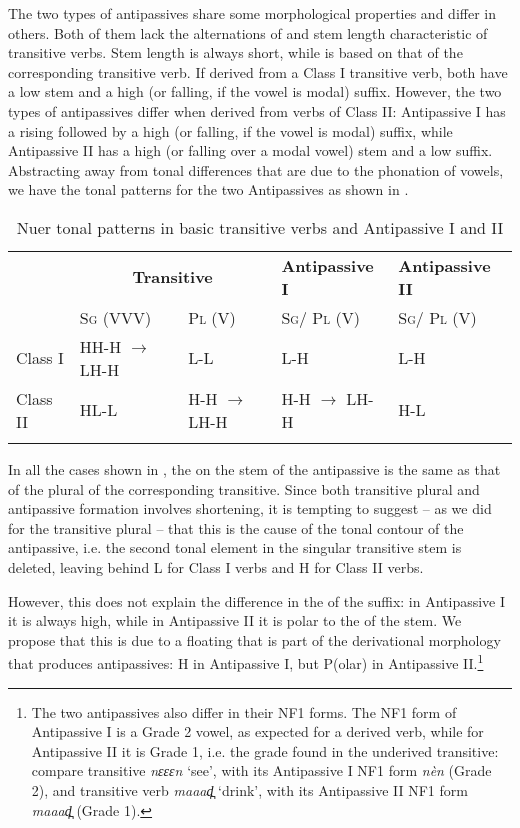 \documentclass[output=paper,newtxmath,modfonts,nonflat]{langsci/langscibook}
\begin{document}
The two types of antipassives share some morphological properties and differ in others. Both of them lack the alternations of  and stem length characteristic of transitive verbs. Stem length is always short, while  is based on that of the corresponding transitive verb. If derived from a Class I transitive verb, both have a low  stem and a high  (or falling, if the vowel is modal) suffix. However, the two types of antipassives differ when derived from verbs of Class II: Antipassive I has a rising  followed by a high (or falling, if the vowel is modal) suffix, while Antipassive II has a high (or falling over a modal vowel) stem and a low suffix. Abstracting away from tonal differences that are due to the phonation of vowels, we have the tonal patterns for the two Antipassives as shown in .

\newpage

\begin{table}
\begin{tabularx}{\textwidth}{llXXX} 
\lsptoprule
& \multicolumn{2}{c}{\bfseries Transitive} & \bfseries Antipassive I & \bfseries Antipassive II\\
& \textsc{Sg} (VVV) & \textsc{Pl} (V) & \textsc{Sg}/ \textsc{Pl} (V) & \textsc{Sg}/ \textsc{Pl} (V)\\
\midrule
Class I & HH-H $\rightarrow$ LH-H & L-L & L-H & L-H\\
Class II & HL-L & H-H $\rightarrow$ LH-H & H-H $\rightarrow$ LH-H & H-L\\
\lspbottomrule
\end{tabularx}
\caption{Nuer tonal patterns in basic transitive verbs and Antipassive I and II}
\label{tab:monich:13}
\end{table}

In all the cases shown in , the  on the stem of the antipassive is the same as that of the plural of the corresponding  transitive. Since both transitive plural and antipassive formation involves shortening, it is tempting to suggest – as we did for the transitive plural – that this is the cause of the tonal contour of the antipassive, i.e. the second tonal element in the singular transitive stem is deleted, leaving behind L for Class I verbs and H for Class II verbs. 

However, this does not explain the difference in the  of the suffix: in Antipassive I it is always high, while in Antipassive II it is polar to the  of the stem. We propose that this is due to a floating  that is part of the derivational morphology that produces antipassives: H in Antipassive I, but P(olar) in Antipassive II.\footnote{The two antipassives also differ in their NF1 forms. The NF1 form of Antipassive I is a Grade 2 vowel, as expected for a derived verb, while for Antipassive II it is Grade 1, i.e. the grade found in the underived transitive: compare transitive \textit{nɛɛɛn} ‘see’, with its Antipassive I NF1 form \textit{nèn} (Grade 2), and transitive verb \textit{maaad̪} ‘drink’, with its Antipassive II NF1 form \textit{maaad̪} (Grade 1).}  
\end{document}
